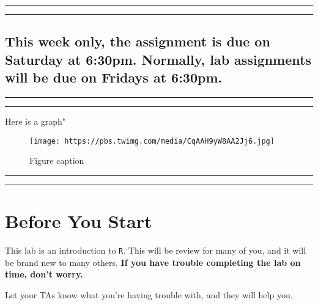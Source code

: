 \documentclass[]{article}
\begin{document}
\begin{center}\rule{0.5\linewidth}{\linethickness}\end{center}

\begin{center}\rule{0.5\linewidth}{\linethickness}\end{center}

\hypertarget{this-week-only-the-assignment-is-due-on-saturday-at-630pm.-normally-lab-assignments-will-be-due-on-fridays-at-630pm.}{%
\subsection{This week only, the assignment is due on Saturday at 6:30pm.
Normally, lab assignments will be due on Fridays at
6:30pm.}\label{this-week-only-the-assignment-is-due-on-saturday-at-630pm.-normally-lab-assignments-will-be-due-on-fridays-at-630pm.}}

\begin{center}\rule{0.5\linewidth}{\linethickness}\end{center}

\begin{center}\rule{0.5\linewidth}{\linethickness}\end{center}

Here is a graph"

\begin{figure}
\centering
\texttt{[image: https://pbs.twimg.com/media/CqAAH9yW8AA2Jj6.jpg]}
\caption{Figure caption}
\end{figure}

\begin{center}\rule{0.5\linewidth}{\linethickness}\end{center}

\begin{center}\rule{0.5\linewidth}{\linethickness}\end{center}

\hypertarget{before-you-start}{%
\section{Before You Start}\label{before-you-start}}

This lab is an introduction to \texttt{R}. This will be review for many
of you, and it will be brand new to many others. \textbf{If you have
trouble completing the lab on time, don't worry.}

Let your TAs know what you're having trouble with, and they will help
you.
\end{document}
